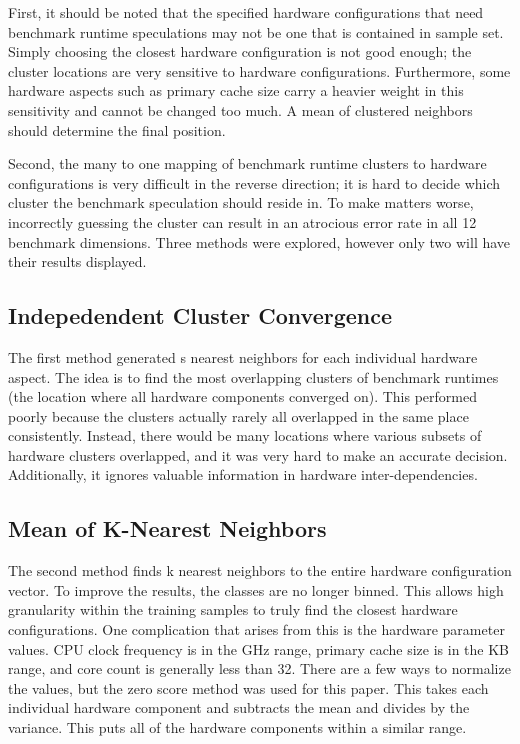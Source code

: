 \documentclass[10pt,twocolumn,letterpaper]{article}
\begin{document}
First, it should be noted that the specified hardware configurations that need benchmark runtime speculations may not be one that is contained in sample set.
Simply choosing the closest hardware configuration is not good enough; the cluster locations are very sensitive to hardware configurations.
Furthermore, some hardware aspects such as primary cache size carry a heavier weight in this sensitivity and cannot be changed too much.
A mean of clustered neighbors should determine the final position.

Second, the many to one mapping of benchmark runtime clusters to hardware configurations is very difficult in the reverse direction; it is hard to decide which cluster the benchmark speculation should reside in.
To make matters worse, incorrectly guessing the cluster can result in an atrocious error rate in all 12 benchmark dimensions.
Three methods were explored, however only two will have their results displayed.

\subsection{Indepedendent Cluster Convergence}

The first method generated s nearest neighbors for each individual hardware aspect.
The idea is to find the most overlapping clusters of benchmark runtimes (the location where all hardware components converged on).
This performed poorly because the clusters actually rarely all overlapped in the same place consistently.
Instead, there would be many locations where various subsets of hardware clusters overlapped, and it was very hard to make an accurate decision.
Additionally, it ignores valuable information in hardware inter-dependencies.

\subsection{Mean of K-Nearest Neighbors}

The second method finds k nearest neighbors to the entire hardware configuration vector.
To improve the results, the classes are no longer binned.
This allows high granularity within the training samples to truly find the closest hardware configurations.
One complication that arises from this is the hardware parameter values.
CPU clock frequency is in the GHz range, primary cache size is in the KB range, and core count is generally less than 32.
There are a few ways to normalize the values, but the zero score method was used for this paper.
This takes each individual hardware component and subtracts the mean and divides by the variance.
This puts all of the hardware components within a similar range.
\end{document}
